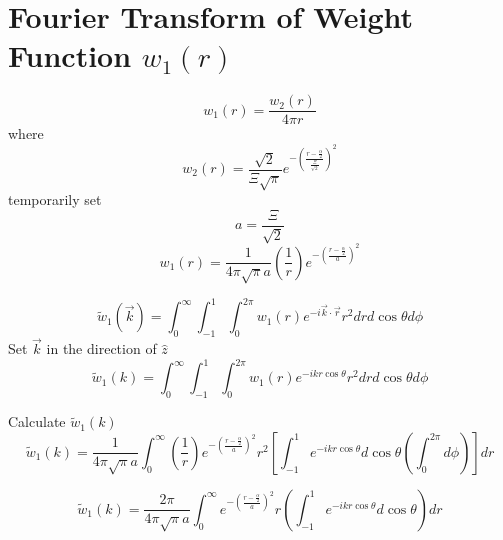 \documentclass[double,12pt]{beavtex}
\begin{document}
\section{Fourier Transform of Weight Function $w_{1}(r)$}
\begin{equation}{w_1(r)=\frac{w_2(r)}{4{\pi}r}}\end{equation}
where
\begin{equation}{w_2(r)=\frac{\sqrt{2}}{\Xi\sqrt{\pi}}e^{-\left(\frac{r-\frac{\alpha}{2}}{\frac{\Xi}{\sqrt{2}}}\right)^2}}\end{equation}
temporarily set 
\begin{equation}{a=\frac{\Xi}{\sqrt{2}}}\end{equation}
\begin{equation}{w_1(r)=\frac{1}{4{\pi}\sqrt{\pi}a}\left(\frac{1}{r}\right)e^{-\left(\frac{r-\frac{\alpha}{2}}{a}\right)^2}}\end{equation}

\begin{equation}{\widetilde{w}_1(\vec{k})=\int_{0}^{\infty}\int_{-1}^{1}\int_{0}^{2\pi}w_1(r)e^{-i\vec{k}\cdot{\vec{r}}}r^2d{r}d{\cos\theta}d{\phi}}\end{equation}
Set $\vec{k}$ in the direction of $\hat{z}$ 
\begin{equation}{\widetilde{w}_1(k)=\int_{0}^{\infty}\int_{-1}^{1}\int_{0}^{2\pi}w_1(r)e^{-ikr\cos\theta}r^2d{r}d{\cos\theta}d{\phi}}\end{equation}

\noindent Calculate $\widetilde{w}_1(k)$ 
\begin{equation}{\widetilde{w}_1(k)=\frac{1}{4{\pi}\sqrt{\pi}a}\int_{0}^{\infty}\left(\frac{1}{r}\right)e^{-\left(\frac{r-\frac{\alpha}{2}}{a}\right)^2}r^2\left[\int_{-1}^{1}e^{-ikr\cos\theta}d{\cos\theta}\left(\int_{0}^{2\pi}d{\phi}\right)\right]d{r}}\end{equation}

\begin{equation}{\widetilde{w}_1(k)=\frac{2\pi}{4{\pi}\sqrt{\pi}a}\int_{0}^{\infty}e^{-\left(\frac{r-\frac{\alpha}{2}}{a}\right)^2}r\left(\int_{-1}^{1}e^{-ikr\cos\theta}d{\cos\theta}\right)d{r}}\end{equation}
\end{document}
